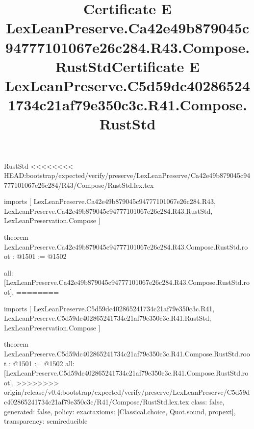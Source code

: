 \begin{lexlean}{RustStd}
<<<<<<<< HEAD:bootstrap/expected/verify/preserve/LexLeanPreserve/Ca42e49b879045c94777101067e26c284/R43/Compose/RustStd.lex.tex
\title{Certificate E LexLeanPreserve.Ca42e49b879045c94777101067e26c284.R43.Compose.RustStd}
\begin{coremodule}
imports [
  LexLeanPreserve.Ca42e49b879045c94777101067e26c284.R43,
  LexLeanPreserve.Ca42e49b879045c94777101067e26c284.R43.RustStd,
  LexLeanPreservation.Compose
]

theorem LexLeanPreserve.Ca42e49b879045c94777101067e26c284.R43.Compose.RustStd.root : @1501 := @1502 {
  all: [LexLeanPreserve.Ca42e49b879045c94777101067e26c284.R43.Compose.RustStd.root],
========
\title{Certificate E LexLeanPreserve.C5d59dc402865241734c21af79e350c3c.R41.Compose.RustStd}
\begin{coremodule}
imports [
  LexLeanPreserve.C5d59dc402865241734c21af79e350c3c.R41,
  LexLeanPreserve.C5d59dc402865241734c21af79e350c3c.R41.RustStd,
  LexLeanPreservation.Compose
]

theorem LexLeanPreserve.C5d59dc402865241734c21af79e350c3c.R41.Compose.RustStd.root : @1501 := @1502 {
  all: [LexLeanPreserve.C5d59dc402865241734c21af79e350c3c.R41.Compose.RustStd.root],
>>>>>>>> origin/release/v0.4:bootstrap/expected/verify/preserve/LexLeanPreserve/C5d59dc402865241734c21af79e350c3c/R41/Compose/RustStd.lex.tex
  class: false,
  generated: false,
  policy: exact{axioms: [Classical.choice, Quot.sound, propext]},
  transparency: semireducible
}


\end{coremodule}}
\end{coremodule}
\end{lexlean}
